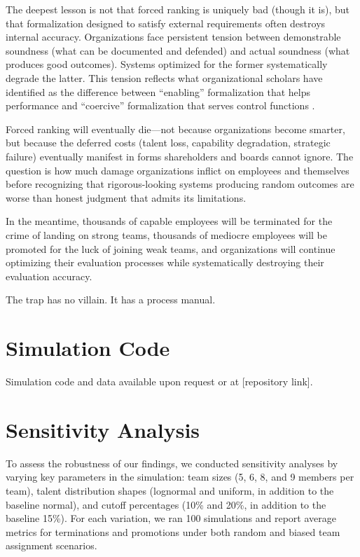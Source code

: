\documentclass[12pt]{article}
\begin{document}
The deepest lesson is not that forced ranking is uniquely bad (though it is), but that formalization designed to satisfy external requirements often destroys internal accuracy. Organizations face persistent tension between demonstrable soundness (what can be documented and defended) and actual soundness (what produces good outcomes). Systems optimized for the former systematically degrade the latter. This tension reflects what organizational scholars have identified as the difference between ``enabling'' formalization that helps performance and ``coercive'' formalization that serves control functions \citep{adler1996two}.

Forced ranking will eventually die---not because organizations become smarter, but because the deferred costs (talent loss, capability degradation, strategic failure) eventually manifest in forms shareholders and boards cannot ignore. The question is how much damage organizations inflict on employees and themselves before recognizing that rigorous-looking systems producing random outcomes are worse than honest judgment that admits its limitations.

In the meantime, thousands of capable employees will be terminated for the crime of landing on strong teams, thousands of mediocre employees will be promoted for the luck of joining weak teams, and organizations will continue optimizing their evaluation processes while systematically destroying their evaluation accuracy.

The trap has no villain. It has a process manual.




\newpage
\appendix

\section{Simulation Code}

Simulation code and data available upon request or at [repository link].

\section{Sensitivity Analysis}

To assess the robustness of our findings, we conducted sensitivity analyses by varying key parameters in the simulation: team sizes (5, 6, 8, and 9 members per team), talent distribution shapes (lognormal and uniform, in addition to the baseline normal), and cutoff percentages (10\% and 20\%, in addition to the baseline 15\%). For each variation, we ran 100 simulations and report average metrics for terminations and promotions under both random and biased team assignment scenarios.
\end{document}
